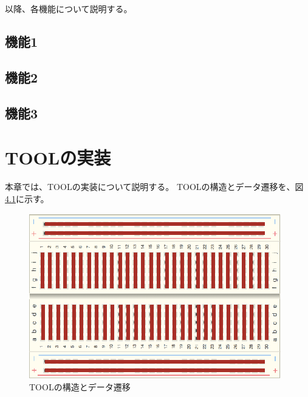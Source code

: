 \documentclass[uplatex, report, a4j, 10pt, dvipdfmx]{jsbook}
\newcommand{\tool}{TOOL}
\begin{document}
以降、各機能について説明する。



\section{機能1}

\section{機能2}
\section{機能3}

\chapter{\tool{}の実装}\label{cha:Implementation}

本章では、\tool{}の実装について説明する。
\tool{}の構造とデータ遷移を、図\ref{fig:toolStructure}に示す。

\begin{figure}[t]
	\centering
	\includegraphics[width=.8\linewidth]{./figs/breadboard.eps}
	\caption{\tool{}の構造とデータ遷移}
	\label{fig:toolStructure}
\end{figure}
\end{document}
